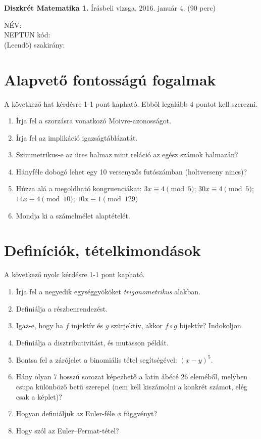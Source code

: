\documentclass[11pt,a4paper]{article}
\begin{document}
\thispagestyle{empty}

\begin{center}
\begin{large}
\noindent \textbf{Diszkrét Matematika 1.} Írásbeli vizsga, 2016. január 4. (90 perc)
\end{large}
\end{center}

{\noindent NÉV: \\ NEPTUN kód:\\ (Leendő) szakirány:\\}
\section{Alapvető fontosságú fogalmak}
A következő hat kérdésre 1-1 pont kapható. Ebből legalább 4 pontot kell szerezni.
\begin{enumerate}\setlength{\itemsep}{3cm}

\item Írja fel a szorzásra vonatkozó Moivre-azonosságot. \vspace{-.5cm}
\item Írja fel az implikáció igazságtáblázatát.
\item Szimmetrikus-e az üres halmaz mint reláció az egész számok halmazán?
\item Hányféle dobogó lehet egy 10 versenyzős futószámban (holtverseny nincs)?
\item Húzza alá a megoldható kongruenciákat: $3x\equiv 4\pmod 5$;  $30x\equiv 4\pmod 5$;  $14x\equiv 4\pmod {10}$;  $10x\equiv 1\pmod {129}$\vspace{-1.5cm}
\item Mondja ki a számelmélet alaptételét.
\end{enumerate}

\newpage
\section{Definíciók, tételkimondások}
A következő nyolc kérdésre 1-1 pont kapható. 
\begin{enumerate}\setlength{\itemsep}{4.2cm}

\item Írja fel a negyedik egységgyököket \emph{trigonometrikus} alakban.
\item Definiálja a részbenrendezést.
\item Igaz-e, hogy ha $f$ injektív és $g$ szürjektív, akkor $f\circ g$ bijektív? Indokoljon.
\item Definiálja a disztributivitást, és mutasson példát.

\newpage
\item Bontsa fel a zárójelet a binomiális tétel segítségével: $(x-y)^5$.
\item Hány olyan 7 hosszú sorozat képezhető a latin ábécé 26 eleméből, melyben csupa különböző betű szerepel (nem kell kiszámolni a konkrét számot, elég csak a képlet)?
\item Hogyan definiáljuk az Euler-féle $\phi$ függvényt?
\item Hogy szól az Euler--Fermat-tétel?


\end{enumerate}
\end{document}
